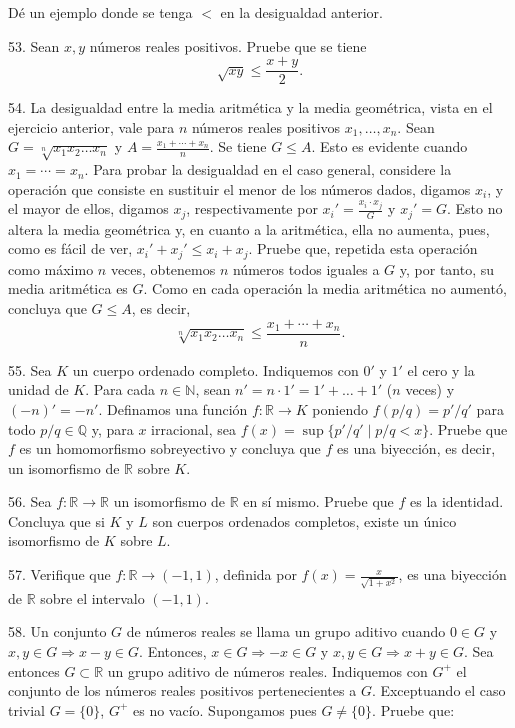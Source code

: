 \documentclass[12pt,oneside]{book}
\begin{document}
Dé un ejemplo donde se tenga \(<\) en la desigualdad anterior.

53. Sean \(x, y\) números reales positivos. Pruebe que se tiene
\[
\sqrt{xy} \leq \frac{x + y}{2}.
\]

54. La desigualdad entre la media aritmética y la media geométrica, vista en el ejercicio anterior, vale para \(n\) números reales positivos \(x_1, \dots, x_n\). Sean \(G = \sqrt[n]{x_1 x_2 \dots x_n}\) y
\(A = \frac{x_1 + \cdots + x_n}{n}\). Se tiene \(G \leq A\). Esto es evidente cuando \(x_1 = \cdots = x_n\). Para probar la desigualdad en el caso general, considere la operación que consiste en sustituir el menor de los números dados, digamos \(x_i\), y el mayor de ellos, digamos \(x_j\), respectivamente por \(x_i' = \frac{x_i \cdot x_j}{G}\) y \(x_j' = G\). Esto no altera la media geométrica y, en cuanto a la aritmética, ella no aumenta, pues, como es fácil de ver, \(x_i' + x_j' \leq x_i + x_j\). Pruebe que, repetida esta operación como máximo \(n\) veces, obtenemos \(n\) números todos iguales a \(G\) y, por tanto, su media aritmética es \(G\). Como en cada operación la media aritmética no aumentó, concluya que \(G \leq A\), es decir,
\[
\sqrt[n]{x_1 x_2 \dots x_n} \leq \frac{x_1 + \cdots + x_n}{n}.
\]

55. Sea \(K\) un cuerpo ordenado completo. Indiquemos con \(0'\) y \(1'\) el cero y la unidad de \(K\). Para cada \(n \in \mathbb{N}\), sean \(n' = n \cdot 1' = 1' + \dots + 1'\) (\(n\) veces) y \((-n)' = -n'\). Definamos una función \(f: \mathbb{R} \to K\) poniendo \(f(p/q) = p'/q'\) para todo \(p/q \in \mathbb{Q}\) y, para \(x\) irracional, sea \(f(x) = \sup\{p'/q' \mid p/q < x\}\). Pruebe que \(f\) es un homomorfismo sobreyectivo y concluya que \(f\) es una biyección, es decir, un isomorfismo de \(\mathbb{R}\) sobre \(K\).

56. Sea \(f: \mathbb{R} \to \mathbb{R}\) un isomorfismo de \(\mathbb{R}\) en sí mismo. Pruebe que \(f\) es la identidad. Concluya que si \(K\) y \(L\) son cuerpos ordenados completos, existe un único isomorfismo de \(K\) sobre \(L\).

57. Verifique que \(f: \mathbb{R} \to (-1, 1)\), definida por \(f(x) = \frac{x}{\sqrt{1 + x^2}}\), es una biyección de \(\mathbb{R}\) sobre el intervalo \((-1, 1)\).

58. Un conjunto \(G\) de números reales se llama un grupo aditivo cuando \(0 \in G\) y \(x, y \in G \Rightarrow x - y \in G\). Entonces, \(x \in G \Rightarrow -x \in G\) y \(x, y \in G \Rightarrow x + y \in G\). Sea entonces \(G \subset \mathbb{R}\) un grupo aditivo de números reales. Indiquemos con \(G^+\) el conjunto de los números reales positivos pertenecientes a \(G\). Exceptuando el caso trivial \(G = \{0\}\), \(G^+\) es no vacío. Supongamos pues \(G \neq \{0\}\). Pruebe que:
\end{document}
